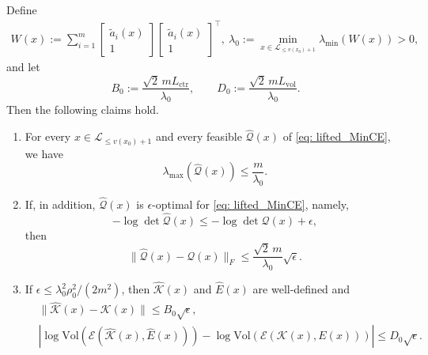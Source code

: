 \documentclass[smallextended]{svjour3}
\newcommand{\V}{{\mathrm{Vol}}}
\newcommand{\K}{\mathcal{K}}
\newcommand{\E}{\mathcal{E}}
\begin{document}
\begin{lemma}\label{lemma: inexact_oracle_recovery}
    Define
    \begin{align}\label{eq: inexact_lambda0}
        W(x):=
        \sum_{i=1}^m
        \begin{bmatrix}
            \tilde{a}_i(x)\\ 1
        \end{bmatrix}
        \begin{bmatrix}
            \tilde{a}_i(x)\\ 1
        \end{bmatrix}^{\top},
        ~
        \lambda_0:=\min_{x\in \mathcal{L}_{\leq v(x_0)+1}}\lambda_{\min}(W(x))>0,
    \end{align}
    and let
    \[
        B_0:=\frac{\sqrt{2}\,mL_{\mathrm{ctr}}}{\lambda_0},
        \qquad
        D_0:=\frac{\sqrt{2}\,mL_{\mathrm{vol}}}{\lambda_0}.
    \]
    Then the following claims hold.
    \begin{enumerate}
        \item For every $x\in \mathcal{L}_{\leq v(x_0)+1}$ and every feasible $\widehat{\mathcal{Q}}(x)$ of \eqref{eq: lifted_MinCE}, we have
        \[
            \lambda_{\max}(\widehat{\mathcal{Q}}(x))\le \frac{m}{\lambda_0}.
        \]
        \item If, in addition, $\widehat{\mathcal{Q}}(x)$ is $\epsilon$-optimal for \eqref{eq: lifted_MinCE}, namely,
        \[
            -\log \det \widehat{\mathcal{Q}}(x)\le -\log \det \mathcal{Q}(x)+\epsilon,
        \]
        then
        \[
            \|\widehat{\mathcal{Q}}(x)-\mathcal{Q}(x)\|_F
            \le \frac{\sqrt{2}\,m}{\lambda_0}\sqrt{\epsilon}.
        \]
        \item If $\epsilon\le \lambda_0^2\rho_0^2/(2m^2)$, then $\widehat{\K}(x)$ and $\widehat{E}(x)$ are well-defined and
        \begin{align*}
            & \|\widehat{\K}(x)-\K(x)\|
            \le B_0\sqrt{\epsilon}, \\
            & \left|
                \log\V(\E(\widehat{\K}(x),\widehat{E}(x)))
                -
                \log\V(\E(\K(x),E(x)))
            \right|
            \le D_0\sqrt{\epsilon}.
        \end{align*}
    \end{enumerate}
\end{lemma}
\end{document}
